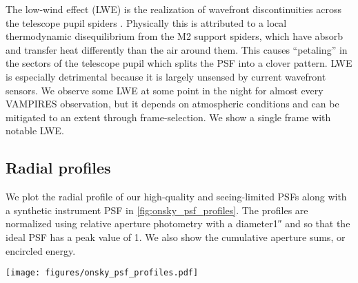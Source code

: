 The low-wind effect (LWE) is the realization of wavefront discontinuities across the telescope pupil spiders  \citep{cantalloube_origin_2018}. Physically this is attributed to a local thermodynamic disequilibrium from the M2 support spiders, which have absorb and transfer heat differently than the air around them. This causes ``petaling'' in the sectors of the telescope pupil which splits the PSF into a clover pattern. LWE is especially detrimental because it is largely unsensed by current wavefront sensors. We observe some LWE at some point in the night for almost every VAMPIRES observation, but it depends on atmospheric conditions and can be mitigated to an extent through frame-selection. We show a single \SI{}{\millisecond} frame with notable LWE.

\subsection{Radial profiles}
We plot the radial profile of our high-quality and seeing-limited PSFs along with a synthetic instrument PSF in \autoref{fig:onsky_psf_profiles}. The profiles are normalized using relative aperture photometry with a  diameter\ang{;;1} and so that the ideal PSF has a peak value of 1. We also show the cumulative aperture sums, or encircled energy.
\begin{figure*}
    \centering
    \texttt{[image: figures/onsky\_psf\_profiles.pdf]}
    \caption{\label{fig:onsky_psf_profiles}}
\end{figure*}
